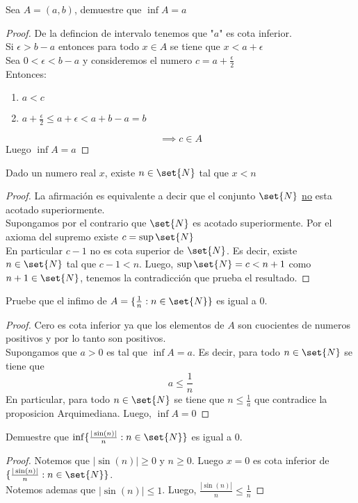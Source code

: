 \documentclass[11pt]{book}
\begin{document}
    \begin{ejm}
        Sea $A=(a,b)$, demuestre que $\inf A=a$
    \end{ejm}
    \begin{proof}
        De la defincion de intervalo tenemos que "$a$" es cota inferior.\\
        Si $\epsilon>b-a$ entonces para todo $x\in A$ se tiene que $x<a+\epsilon$\\
        Sea $0<\epsilon<b-a$ y consideremos el numero $c=a+\frac{\epsilon}{2}$\\
        Entonces:
        \begin{enumerate}
            \item $a<c$

            \item $a+\frac{\epsilon}{2}\leq a+\epsilon<a+b-a=b$
        \end{enumerate}
        \[\implies c\in A\]
        Luego $\inf A=a$
    \end{proof}
    \begin{prop}[Arquimediana]
        Dado un numero real $x$, existe $n\in\set{N}$ tal que $x<n$
    \end{prop}
    \begin{proof}
        La afirmación es equivalente a decir que el conjunto $\set{N}$ \underline{no} esta acotado superiormente.\\
        Supongamos por el contrario que $\set{N}$ es acotado superiormente. Por el axioma del supremo existe $c=\sup\set{N}$\\
        En particular $c-1$ no es cota superior de $\set{N}$. Es decir, existe $n\in\set{N}$ tal que $c-1<n$. Luego, $\sup\set{N}=c<n+1$ como $n+1\in\set{N}$, tenemos la contradicción que prueba el resultado.
    \end{proof}

    \begin{ejm}
        Pruebe que el infimo de $A=\{\frac{1}{n}:n\in\set{N}\}$ es igual a $0$.
    \end{ejm}
    \begin{proof}
        Cero es cota inferior ya que los elementos de $A$ son cuocientes de numeros positivos y por lo tanto son positivos.\\
        Supongamos que $a>0$ es tal que $\inf A=a$. Es decir, para todo $n\in\set{N}$ se tiene que
        \[a\leq\frac{1}{n}\]
        En particular, para todo $n\in\set{N}$ se tiene que $n\leq\frac{1}{a}$ que contradice la proposicion Arquimediana. Luego, $\inf A=0$
    \end{proof}

    \begin{ejm}
        Demuestre que $\inf\{\frac{|\sin(n)|}{n}:n\in\set{N}\}$ es igual a $0$.
    \end{ejm}

    \begin{proof}
        Notemos que $|\sin(n)|\geq 0$ y $n\geq0$. Luego $x=0$ es cota inferior de $\{\frac{|\sin(n)|}{n}:n\in\set{N}\}$.\\
        Notemos ademas que $|\sin(n)|\leq 1$. Luego, $\frac{|\sin(n)|}{n}\leq\frac{1}{n}$
    \end{proof}
\end{document}

